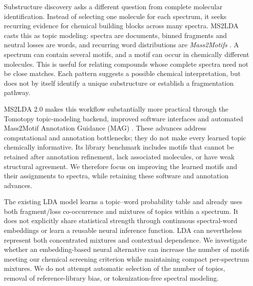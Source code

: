\documentclass[10pt,a4paper]{article}
\begin{document}
Substructure discovery asks a different question from complete molecular
identification. Instead of selecting one molecule for each spectrum, it seeks
recurring evidence for chemical building blocks across many spectra.
MS2LDA casts this as topic modeling: spectra are documents, binned fragments
and neutral losses are words, and recurring word distributions are
\emph{Mass2Motifs} \cite{vanderhooft2016}. A spectrum can contain several
motifs, and a motif can occur in chemically different molecules. This is useful
for relating compounds whose complete spectra need not be close matches.
Each pattern suggests a possible chemical interpretation, but does not by
itself identify a unique substructure or establish a fragmentation pathway.

MS2LDA 2.0 makes this workflow substantially more practical through the
Tomotopy topic-modeling backend, improved software interfaces and automated
Mass2Motif Annotation Guidance (MAG) \cite{torresortega2026}. These advances
address computational and annotation bottlenecks; they do not make every
learned topic chemically informative. Its library benchmark includes motifs
that cannot be retained after annotation refinement, lack associated molecules,
or have weak structural agreement. We therefore focus on improving the learned
motifs and their assignments to spectra, while retaining these software and
annotation advances.

The existing LDA model learns a topic--word probability table and already uses
both fragment/loss co-occurrence and mixtures of topics within a spectrum.
It does not explicitly share statistical strength through continuous
spectral-word embeddings or learn a reusable neural inference function.
LDA can nevertheless represent both concentrated mixtures and contextual
dependence. We investigate whether an embedding-based neural alternative
can increase the number of motifs meeting our chemical screening criterion
while maintaining compact per-spectrum mixtures. We do not attempt automatic
selection of the number of topics, removal of reference-library bias, or
tokenization-free spectral modeling.
\end{document}
